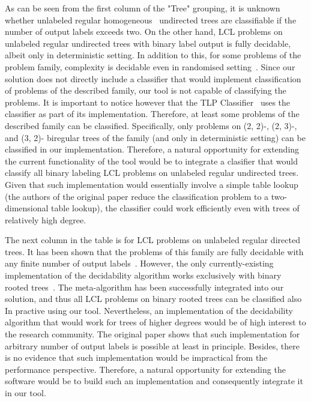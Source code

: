 As can be seen from the first column of the "Tree" grouping, it is unknown whether
unlabeled regular homogeneous~\cite{BalliuHomogeneous}
undirected trees are classifiable if the number of
output labels exceeds two. On the other hand, LCL problems on
unlabeled regular undirected trees with binary label output is fully decidable, albeit
only in deterministic setting. In addition to this, for some problems of the problem family,
complexity is decidable even in randomised setting~\cite{Balliu2019c}.
Since our solution does not directly include a classifier that would implement
classification of problems of the described family, our tool is not capable of
classifying the problems. It is important to notice however that the TLP
Classifier~\cite{Rocher2020clas} uses the classifier as part of its implementation.
Therefore, at least some problems of the described family can be classified. Specifically,
only problems on (2, 2)-, (2, 3)-, and (3, 2)- biregular trees of the family
(and only in deterministic setting) can be classified in our implementation.
Therefore, a natural opportunity for extending the current functionality of the tool
would be to integrate a clasifier that would classify all binary labeling LCL problems
on unlabeled regular undirected trees. Given that such implementation would
essentially involve a simple table lookup (the authors of the original paper
reduce the classification problem to a two-dimensional table lookup), the
classifier could work efficiently even with trees of relatively high degree.

The next column in the table is for LCL problems on unlabeled regular directed
trees. It has been shown that the problems of this family are fully decidable
with any finite number of output labels~\cite{Balliu2021}. However, the
only currently-existing implementation of the decidability algorithm
works exclusively with binary rooted trees~\cite{Studeny2021}. The
meta-algorithm has been successfully integrated into our solution, and
thus all LCL problems on binary rooted trees can be classified also In
practive using our tool. Nevertheless, an implementation of the
decidability algorithm that would work for trees of higher degrees
would be of high interest to the research community. The original
paper shows that such implementation for arbitrary number of output
labels is possible at least in principle. Besides, there is no
evidence that such implementation would be impractical from the
performance perspective. Therefore, a natural opportunity for
extending the software would be to build such an implementation and
consequently integrate it in our tool.

